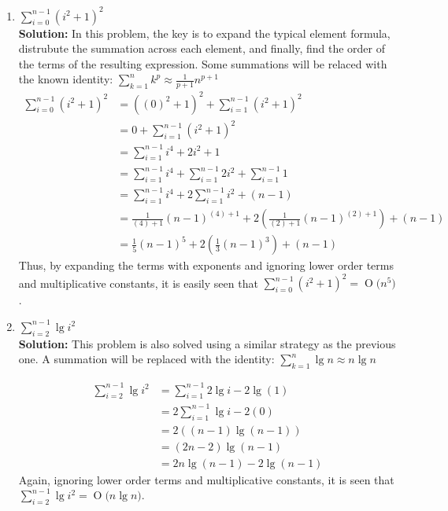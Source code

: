 \documentclass[11pts]{article}
\newcommand{\BigO}[1]{\ensuremath{\operatorname{O}\bigl(#1\bigr)}}
\begin{document}
\begin{enumerate}
  \begin{enumerate}
  \item $ \sum_{i=0}^{n-1}{(i^{2}+1)^{2}} $ \\

  \textbf{Solution:} In this problem, the key is to expand the typical element
  formula, distrubute the summation across each element, and finally, find
  the order of the terms of the resulting expression. Some summations will be
  relaced with the known identity: 
  $ \sum_{k=1}^{n}{k^{p}} \approx \frac{1}{p+1}n^{p+1} $
  \begin{align*}
    \sum_{i=0}^{n-1}{(i^{2}+1)^{2}}
        &= ((0)^{2} + 1)^{2} + \sum_{i=1}^{n-1}{(i^{2}+1)^{2}} \\
    &= 0 + \sum_{i=1}^{n-1}{(i^{2}+1)^{2}}\\
    &= \sum_{i=1}^{n-1}{i^{4} + 2i^{2} + 1}\\
    &= \sum_{i=1}^{n-1}{i^{4}} + \sum_{i=1}^{n-1}{2i^{2}} +
        \sum_{i=1}^{n-1}{1}\\
    &= \sum_{i=1}^{n-1}{i^{4}} + 2\sum_{i=1}^{n-1}{i^{2}} + (n - 1)\\
    &= \frac{1}{(4)+1}(n - 1)^{(4)+1} + 2(\frac{1}{(2)+1}(n - 1)^{(2)+1})
        + (n - 1)\\
    &= \frac{1}{5}(n - 1)^{5} + 2(\frac{1}{3}(n - 1)^{3}) + (n - 1)
  \end{align*}
  Thus, by expanding the terms with exponents and ignoring lower order
  terms and multiplicative constants, it is
  easily seen that $ \sum_{i=0}^{n-1}{(i^{2}+1)^{2}} = \BigO{n^{5}} $.
  \newpage

  \item $ \sum_{i=2}^{n-1}{\lg{i^{2}}} $ \\

  \textbf{Solution:} This problem is also solved using a similar strategy as
  the previous one. A summation will be replaced with the identity:
  $ \sum_{k=1}^{n}{\lg{n}} \approx n \lg{n} $

  \begin{align*}
    \sum_{i=2}^{n-1}{\lg{i^{2}}} &= \sum_{i=1}^{n-1}{2\lg{i}} - 2\lg{(1)} \\
    &= 2\sum_{i=1}^{n-1}{\lg{i}} - 2(0)\\
    &= 2((n - 1)\lg{(n - 1)}) \\
    &= (2n - 2)\lg{(n - 1)} \\
    &= 2n \lg{(n - 1)} - 2 \lg{(n - 1)}
  \end{align*}
  Again, ignoring lower order terms and multiplicative constants,
  it is seen that $ \sum_{i=2}^{n-1}{\lg{i^{2}}} = \BigO{n \lg{n}} $.
  \end{enumerate}
  \newpage


\end{enumerate}
\end{document}
